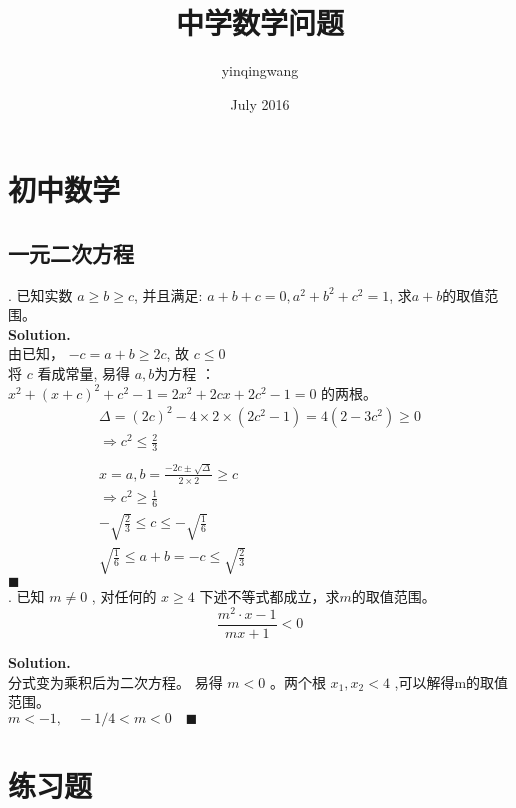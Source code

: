 \documentclass[UTF8]{article}
\title{中学数学问题}
\author{yinqingwang }
\date{July 2016}
\begin{document}
	\maketitle
	\tableofcontents
\newpage

\section{初中数学}
\subsection{一元二次方程}
. 已知实数 $a \ge b \ge c$, 并且满足: $a+b+c=0, a^2+b^2+c^2=1$, 求$a+b$的取值范围。 \\
\noindent \textbf{Solution.} \\
由已知， $ -c = a + b \ge 2c$, 故 $  c \le 0 $ \\
将 $c$ 看成常量, 易得 $a,b$为方程 ： $x^2 + (x+c)^2 + c^2 -1 = 2x^2 + 2cx + 2c^2 -1 =0$ 的两根。
\begin{align*}
\Delta = (2c)^2 - 4\times 2 \times (2c^2-1) = 4(2-3c^2)\ge 0 \\
\Rightarrow  c^2 \le \frac{2}{3} \\
\\
x =a,b = \frac{-2c \pm \sqrt{\Delta }}{2\times 2} \ge c \\
\Rightarrow c^2 \ge \frac{1}{6} \\
-\sqrt{\frac{2}{3}} \le c \le -\sqrt{\frac{1}{6}} \\
\sqrt{\frac{1}{6}} \le a+b=-c \le \sqrt{\frac{2}{3}}
\end{align*}
$\blacksquare$ \\

. 已知 $ m \ne 0$ , 对任何的 $x\ge4$ 下述不等式都成立，求$m$的取值范围。 
$$ \frac{m^2\cdot x -1}{mx+1} < 0 $$

\noindent \textbf{Solution.} \\
分式变为乘积后为二次方程。 易得 $m<0$ 。两个根 $x_1,x_2 <4$ ,可以解得m的取值范围。 \\
$m<-1 , \quad -1/4<m<0 \quad \blacksquare$

\section{练习题}
\end{document}
